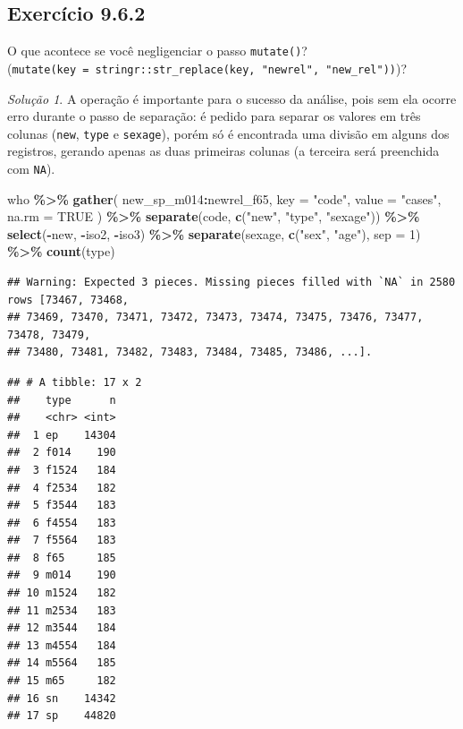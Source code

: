 \documentclass[
]{latex/krantz}
\newenvironment{Shaded}{\begin{snugshade}}{\end{snugshade}}
\newcommand{\AttributeTok}[1]{\textcolor[rgb]{0.13,0.29,0.53}{#1}}
\newcommand{\ConstantTok}[1]{\textcolor[rgb]{0.56,0.35,0.01}{#1}}
\newcommand{\DecValTok}[1]{\textcolor[rgb]{0.00,0.00,0.81}{#1}}
\newcommand{\FunctionTok}[1]{\textcolor[rgb]{0.13,0.29,0.53}{\textbf{#1}}}
\newcommand{\NormalTok}[1]{#1}
\newcommand{\SpecialCharTok}[1]{\textcolor[rgb]{0.81,0.36,0.00}{\textbf{#1}}}
\newcommand{\StringTok}[1]{\textcolor[rgb]{0.31,0.60,0.02}{#1}}
\theoremstyle{definition}
\theoremstyle{definition}
\theoremstyle{definition}
\theoremstyle{definition}
\theoremstyle{remark}
\newtheorem*{solution}{Solução}
\begin{document}
\hypertarget{exr9-6-2}{%
\subsection*{Exercício 9.6.2}\label{exr9-6-2}}

O que acontece se você negligenciar o passo \texttt{mutate()}? (\texttt{mutate(key\ =\ stringr::str\_replace(key,\ "newrel",\ "new\_rel"))})?

\begin{solution}

A operação é importante para o sucesso da análise, pois sem ela ocorre erro durante o passo de separação: é pedido para separar os valores em três colunas (\texttt{new}, \texttt{type} e \texttt{sexage}), porém só é encontrada uma divisão em alguns dos registros, gerando apenas as duas primeiras colunas (a terceira será preenchida com \texttt{NA}).

\begin{Shaded}
\begin{Highlighting}[]
\NormalTok{who }\SpecialCharTok{\%\textgreater{}\%}
  \FunctionTok{gather}\NormalTok{(}
\NormalTok{    new\_sp\_m014}\SpecialCharTok{:}\NormalTok{newrel\_f65, }
    \AttributeTok{key =} \StringTok{"code"}\NormalTok{,}
    \AttributeTok{value =} \StringTok{"cases"}\NormalTok{,}
    \AttributeTok{na.rm =} \ConstantTok{TRUE}
\NormalTok{  ) }\SpecialCharTok{\%\textgreater{}\%}
  \FunctionTok{separate}\NormalTok{(code, }\FunctionTok{c}\NormalTok{(}\StringTok{"new"}\NormalTok{, }\StringTok{"type"}\NormalTok{, }\StringTok{"sexage"}\NormalTok{)) }\SpecialCharTok{\%\textgreater{}\%}
  \FunctionTok{select}\NormalTok{(}\SpecialCharTok{{-}}\NormalTok{new, }\SpecialCharTok{{-}}\NormalTok{iso2, }\SpecialCharTok{{-}}\NormalTok{iso3) }\SpecialCharTok{\%\textgreater{}\%}
  \FunctionTok{separate}\NormalTok{(sexage, }\FunctionTok{c}\NormalTok{(}\StringTok{"sex"}\NormalTok{, }\StringTok{"age"}\NormalTok{), }\AttributeTok{sep =} \DecValTok{1}\NormalTok{) }\SpecialCharTok{\%\textgreater{}\%}
  \FunctionTok{count}\NormalTok{(type)}
\end{Highlighting}
\end{Shaded}

\begin{verbatim}
## Warning: Expected 3 pieces. Missing pieces filled with `NA` in 2580 rows [73467, 73468,
## 73469, 73470, 73471, 73472, 73473, 73474, 73475, 73476, 73477, 73478, 73479,
## 73480, 73481, 73482, 73483, 73484, 73485, 73486, ...].
\end{verbatim}

\begin{verbatim}
## # A tibble: 17 x 2
##    type      n
##    <chr> <int>
##  1 ep    14304
##  2 f014    190
##  3 f1524   184
##  4 f2534   182
##  5 f3544   183
##  6 f4554   183
##  7 f5564   183
##  8 f65     185
##  9 m014    190
## 10 m1524   182
## 11 m2534   183
## 12 m3544   184
## 13 m4554   184
## 14 m5564   185
## 15 m65     182
## 16 sn    14342
## 17 sp    44820
\end{verbatim}

\end{solution}
\end{document}
